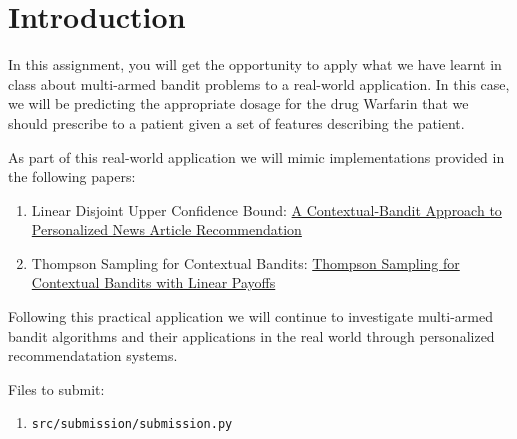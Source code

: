 \section{Introduction}

In this assignment, you will get the opportunity to apply what we have learnt in class about multi-armed bandit problems to a real-world application. In this case, we will be predicting the appropriate dosage for the drug Warfarin that we should prescribe to a patient given a set of features describing the patient.

As part of this real-world application we will mimic implementations provided in the following papers:

\begin{enumerate}
  \item Linear Disjoint Upper Confidence Bound: \href{https://arxiv.org/pdf/1003.0146.pdf}{A Contextual-Bandit Approach to
Personalized News Article Recommendation}
  \item Thompson Sampling for Contextual Bandits: \href{http://proceedings.mlr.press/v28/agrawal13.pdf}{Thompson Sampling for Contextual Bandits with Linear Payoffs}
\end{enumerate}

Following this practical application we will continue to investigate multi-armed bandit algorithms and their applications in the real world through personalized recommendatation systems. 

Files to submit:
\begin{enumerate}
  \item \texttt{src/submission/submission.py}
\end{enumerate}